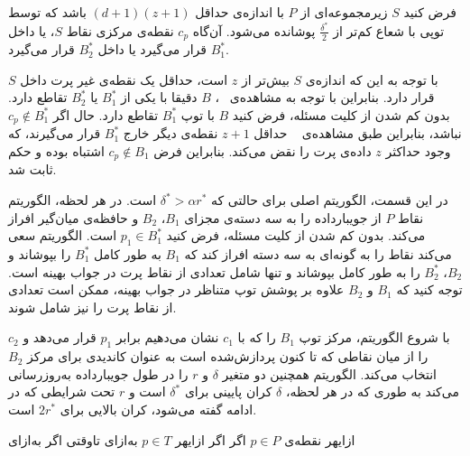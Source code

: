 فرض کنید $S$ زیرمجموعه‌ای از $P$ با اندازه‌ی حداقل $(d+1)(z+1)$ باشد که توسط توپی با شعاع کم‌تر از $\frac{\delta^*}{2}$ پوشانده می‌شود. آن‌گاه $c_p$ نقطه‌ی مرکزی نقاط $S$، یا داخل $B_1^*$ قرار می‌گیرد یا داخل $B_2^*$ قرار می‌گیرد.


با توجه به این که اندازه‌ی $S$ بیش‌تر از $z$ است، حداقل یک نقطه‌ی غیر پرت داخل $S$ قرار دارد. بنابراین با توجه به مشاهده‌ی ~، $B$ دقیقا با یکی از $B_1^*$ یا $B_2^*$ تقاطع دارد. بدون کم شدن از کلیت مسئله، فرض کنید $B$ با توپ $B_1^*$ تقاطع دارد. حال اگر $c_p \not \in B_1^*$ نباشد، بنابراین طبق مشاهده‌ی ~ حداقل $ z+1$ نقطه‌ی دیگر خارج $B_1^*$ قرار می‌گیرند، که وجود حداکثر $z$ داده‌ی پرت را نقض می‌کند. بنابراین فرض $c_p \not \in B_1$ اشتباه بوده و حکم ثابت شد.




در این قسمت، الگوریتم اصلی برای حالتی که $\delta^* > \alpha r^*$ است. در هر لحظه، الگوریتم نقاط $P$ از جویبارداده را به سه دسته‌ی مجزای $B_1$، $B_2$ و حافظه‌ی میان‌گیر  افراز می‌کند. بدون کم شدن از کلیت مسئله، فرض کنید $p_1 \in B_1^*$ است. الگوریتم سعی می‌کند نقا‌ط را به گونه‌ای به سه دسته افراز کند که $B_1$ به طور کامل $B_1^*$ را بپوشاند و $B_2$، $B_2^*$ را به طور کامل بپوشاند و  تنها شامل تعدادی از نقاط پرت در جواب بهینه است. توجه کنید که $B_1$ و $B_2$ علاوه بر پوشش توپ متناظر در جواب بهینه، ممکن است تعدادی از نقاط پرت را نیز شامل شوند. 

با شروع الگوریتم، مرکز توپ $B_1$ را که با $c_1$ نشان می‌دهیم برابر $p_1$ قرار می‌دهد و $c_2$ را از میان نقاطی که تا کنون پردازش‌شده است به عنوان کاندیدی برای مرکز $B_2$ انتخاب می‌کند. الگوریتم همچنین دو متغیر $\delta$ و $r$ را در طول جویبارداده به‌روزرسانی می‌کند به طوری که در هر لحظه، $\delta$ کران پایینی برای $\delta^*$ است و $r$ تحت شرایطی که در ادامه گفته می‌شود، کران بالایی برای $2r^*$ است.
 
‌ازای{هر نقطه‌ی $p \in P$}
‌اگر{}
‌اگر{}
‌ازای{هر $p \in T$}
‌به‌ازای{}
‌تاوقتی{}
‌اگر{}
‌به‌ازای{}

